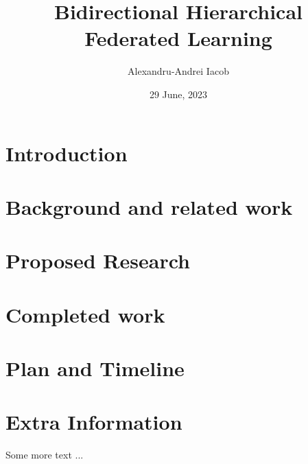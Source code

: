 \documentclass[times, withindex,glossary, backrefs, firstyr]{cam-thesis}
\title{Bidirectional Hierarchical Federated Learning}
\author{Alexandru-Andrei Iacob}
\date{29 June, 2023}
\begin{document}
\frontmatter{}



\chapter{Introduction}

\chapter{Background and related work}\label{sec:back}

\chapter{Proposed Research}\label{sec:proposal}

\chapter{Completed work}\label{sec:completed_work}

\chapter{Plan and Timeline}\label{sec:timeplan}



\renewcommand{\bibname}{References}
\cleardoublepage
{}
{}






\appendix

\chapter{Extra Information}
Some more text ...



\printthesisindex
\end{document}
